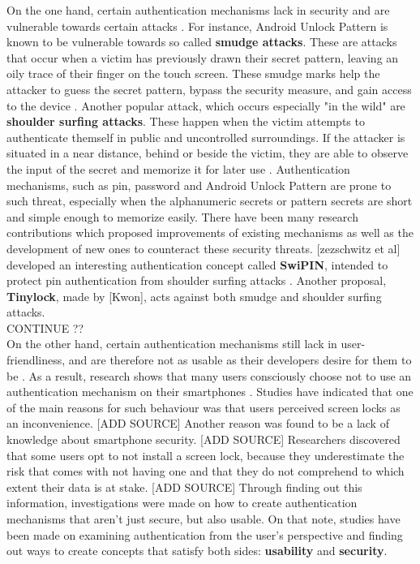 On the one hand, certain authentication mechanisms lack in security and are vulnerable towards certain attacks \cite{Schloeglhofer}. For instance, Android Unlock Pattern is known to be vulnerable towards so called \textbf{smudge attacks}. These are attacks that occur when a victim has previously drawn their secret pattern, leaving an oily trace of their finger on the touch screen. These smudge marks help the attacker to guess the secret pattern, bypass the security measure, and gain access to the device \cite{ediss20251}. Another popular attack, which occurs especially "in the wild" are \textbf{shoulder surfing attacks}. These happen when the victim attempts to authenticate themself in public and uncontrolled surroundings. If the attacker is situated in a near distance, behind or beside the victim, they are able to observe the input of the secret and memorize it for later use \cite{ediss20251}. Authentication mechanisms, such as pin, password and Android Unlock Pattern are prone to such threat, especially when the alphanumeric secrets or pattern secrets are short and simple enough to memorize easily. There have been many research contributions which proposed improvements of existing mechanisms as well as the development of new ones to counteract these security threats. [zezschwitz et al] developed an interesting authentication concept called \textbf{SwiPIN}, intended to protect pin authentication from shoulder surfing attacks \cite{vonZezschwitz:2015:SFS:2702123.2702212}. Another proposal, \textbf{Tinylock}, made by [Kwon], acts against both smudge and shoulder surfing attacks. \\
CONTINUE ?? \\


On the other hand, certain authentication mechanisms still lack in user-friendliness, and are therefore not as usable as their developers desire for them to be \cite{Schloeglhofer}. As a result, research shows that many users consciously choose not to use an authentication mechanism on their smartphones \cite{ediss20251, Albayram:2017:BUL:3235924.3235929, Egelman:2014:YRL:2660267.2660273}. Studies have indicated that one of the main reasons for such behaviour was that users perceived screen locks as an inconvenience. [ADD SOURCE] Another reason was found to be a lack of knowledge about smartphone security. [ADD SOURCE] Researchers discovered that some users opt to not install a screen lock, because they underestimate the risk that comes with not having one and that they do not comprehend to which extent their data is at stake. [ADD SOURCE] Through finding out this information, investigations were made on how to create authentication mechanisms that aren't just secure, but also usable. On that note, studies have been made on examining authentication from the user's perspective and finding out ways to create concepts that satisfy both sides: \textbf{usability} and \textbf{security}. 


